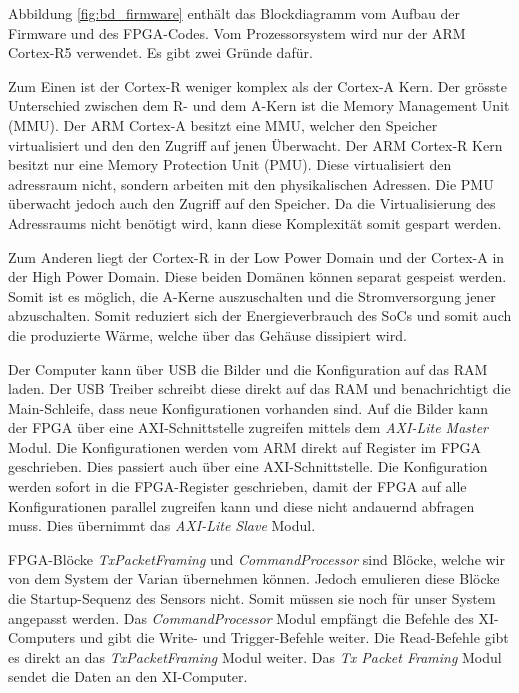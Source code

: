 \documentclass{article}
\begin{document}
Abbildung \ref{fig:bd_firmware} enthält das Blockdiagramm vom Aufbau der Firmware und des FPGA-Codes. Vom Prozessorsystem wird nur der ARM Cortex-R5 verwendet. Es gibt zwei Gründe dafür. 

Zum Einen ist der Cortex-R weniger komplex als der Cortex-A Kern. Der grösste Unterschied zwischen dem R- und dem A-Kern ist die Memory Management Unit (MMU). Der ARM Cortex-A besitzt eine MMU, welcher den Speicher virtualisiert und den den Zugriff auf jenen Überwacht. Der ARM Cortex-R Kern besitzt nur eine Memory Protection Unit (PMU). Diese virtualisiert den adressraum nicht, sondern arbeiten mit den physikalischen Adressen. Die PMU überwacht jedoch auch den Zugriff auf den Speicher. Da die Virtualisierung des Adressraums nicht benötigt wird, kann diese Komplexität somit gespart werden. 

Zum Anderen liegt der Cortex-R in der Low Power Domain und der Cortex-A in der High Power Domain. Diese beiden Domänen können separat gespeist werden. Somit ist es möglich, die A-Kerne auszuschalten und die Stromversorgung jener abzuschalten. Somit reduziert sich der Energieverbrauch des SoCs und somit auch die produzierte Wärme, welche über das Gehäuse dis­si­pie­rt wird.

Der Computer kann über USB die Bilder und die Konfiguration auf das RAM laden. Der USB Treiber schreibt diese direkt auf das RAM und benachrichtigt die Main-Schleife, dass neue Konfigurationen vorhanden sind. Auf die Bilder kann der FPGA über eine AXI-Schnittstelle zugreifen mittels dem \textit{AXI-Lite Master} Modul. Die Konfigurationen werden vom ARM direkt auf Register im FPGA geschrieben. Dies passiert auch über eine AXI-Schnittstelle. Die Konfiguration werden sofort in die FPGA-Register geschrieben, damit der FPGA auf alle Konfigurationen parallel zugreifen kann und diese nicht andauernd abfragen muss. Dies übernimmt das \textit{AXI-Lite Slave} Modul.

FPGA-Blöcke \textit{TxPacketFraming} und \textit{CommandProcessor} sind Blöcke, welche wir von dem System der Varian übernehmen können. Jedoch emulieren diese Blöcke die Startup-Sequenz des Sensors nicht. Somit müssen sie noch für unser System angepasst werden. Das \textit{CommandProcessor} Modul empfängt die Befehle des XI-Computers und gibt die Write- und Trigger-Befehle weiter. Die Read-Befehle gibt es direkt an das \textit{TxPacketFraming} Modul weiter. 
Das \textit{Tx Packet Framing} Modul sendet die Daten an den XI-Computer.
\end{document}

